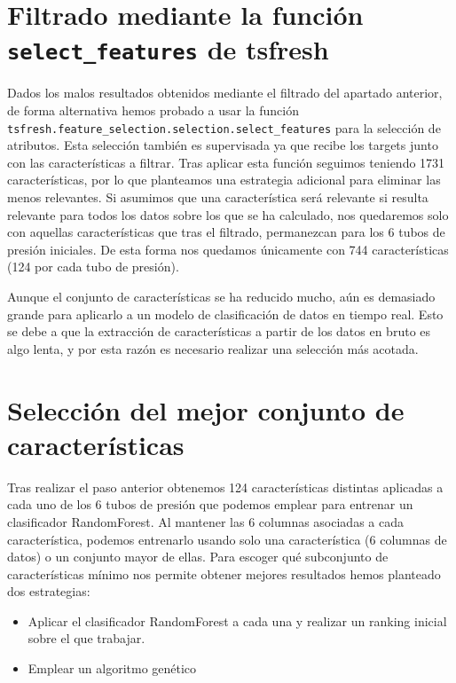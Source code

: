 \documentclass[a4paper,12pt,twoside,oldfontcommands]{memoir}
\begin{document}
	\section{Filtrado mediante la función \texttt{select\_features} de tsfresh}
	Dados los malos resultados obtenidos mediante el filtrado del apartado anterior, de forma alternativa hemos probado a usar la función
	\texttt{tsfresh.feature\_selection.selection.select\_features} para la selección de atributos. Esta selección también es supervisada ya que recibe los targets junto con las características a filtrar. Tras aplicar esta función seguimos teniendo 1731 características, por lo que planteamos una estrategia adicional para eliminar las menos relevantes. Si asumimos que una característica será relevante si resulta relevante para todos los datos sobre los que se ha calculado, nos quedaremos solo con aquellas características que tras el filtrado, permanezcan para los 6 tubos de presión iniciales. De esta forma nos quedamos únicamente con 744 características (124 por cada tubo de presión). 
	
	Aunque el conjunto de características se ha reducido mucho, aún es demasiado grande para aplicarlo a un modelo de clasificación de datos en tiempo real. Esto se debe a que la extracción de características a partir de los datos en bruto es algo lenta, y por esta razón es necesario realizar una selección más acotada.
	
	\section{Selección del mejor conjunto de características}
	
	Tras realizar el paso anterior obtenemos 124 características distintas aplicadas a cada uno de los 6 tubos de presión que podemos emplear para entrenar un clasificador RandomForest. Al mantener las 6 columnas asociadas a cada característica, podemos entrenarlo usando solo una característica (6 columnas de datos) o un conjunto mayor de ellas. Para escoger qué subconjunto de características mínimo nos permite obtener mejores resultados hemos planteado dos estrategias: 
	
	\begin{itemize}
		\item Aplicar el clasificador RandomForest a cada una y realizar un ranking inicial sobre el que trabajar. 
		\item Emplear un algoritmo genético
	\end{itemize}
	
\end{document}
